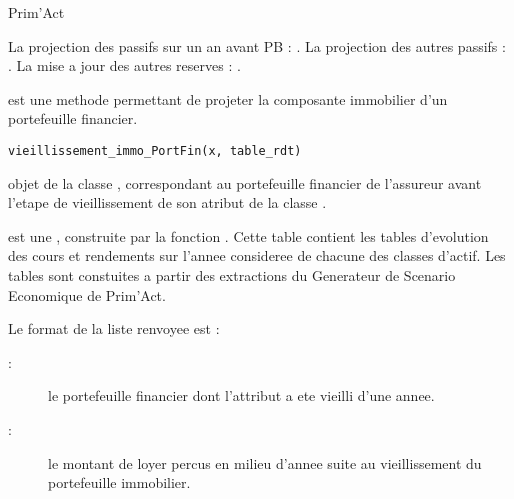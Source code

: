 \documentclass[a4paper]{book}
\begin{document}
%
\begin{Author}\relax
Prim'Act
\end{Author}
%
\begin{SeeAlso}\relax
La projection des passifs sur un an avant PB : .
La projection des autres passifs : .
La mise a jour des autres reserves : .
\end{SeeAlso}
%
\begin{Description}\relax
{} est une methode permettant de projeter la composante immobilier d'un portefeuille financier.
\end{Description}
%
\begin{Usage}
\begin{verbatim}
vieillissement_immo_PortFin(x, table_rdt)
\end{verbatim}
\end{Usage}
%
\begin{Arguments}
\begin{ldescription}
\item[\code{x}] objet de la classe , correspondant au portefeuille financier de l'assureur avant l'etape de vieillissement de son atribut  de la classe .

\item[\code{table\_rdt}] est une , construite par la fonction .
Cette table contient les tables d'evolution des cours et rendements sur l'annee consideree de chacune des classes d'actif.
Les tables sont constuites a partir des extractions du Generateur de Scenario Economique de Prim'Act.
\end{ldescription}
\end{Arguments}
%
\begin{Value}
Le format de la liste renvoyee est :
\begin{description}

\item[ : ] le portefeuille financier dont l'attribut  a ete vieilli d'une annee.
\item[ : ] le montant de loyer percus en milieu d'annee suite au vieillissement du portefeuille immobilier.

\end{description}

\end{Value}
\end{document}
